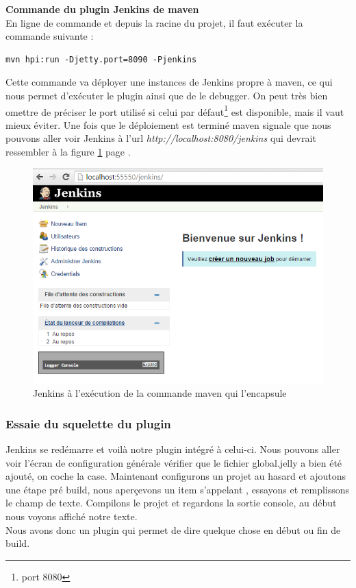\textbf{Commande du plugin Jenkins de maven}\hfill \\ \indent 
En ligne de commande et depuis la racine du projet, il faut exécuter la commande suivante :
\begin{lstlisting}
mvn hpi:run -Djetty.port=8090 -Pjenkins
\end{lstlisting}
Cette commande va déployer une instances de Jenkins propre à maven, ce qui nous permet d'exécuter le plugin ainsi que de le debugger. On peut très bien omettre de préciser le port utilisé si celui par défaut\footnote{port 8080} est disponible, mais il vaut mieux éviter. Une fois que le déploiement est terminé maven signale que  nous pouvons aller voir Jenkins à l'url \emph{http://localhost:8080/jenkins} qui devrait ressembler à la figure \ref{figure:firstJenkinsWhenGenerateTheSkeletonPlugin} page \pageref{figure:firstJenkinsWhenGenerateTheSkeletonPlugin}.
\begin{figure}[!h]
  \centering
      \includegraphics[width=\textwidth]{images/firstJenkinsWhenGenerateTheSkeletonPlugin.png}
  \caption{Jenkins à l'exécution de la commande maven qui l'encapsule}
	\label{figure:firstJenkinsWhenGenerateTheSkeletonPlugin}
\end{figure}



\subsubsection{Essaie du squelette du plugin}
Jenkins se redémarre et voilà notre plugin intégré à celui-ci. Nous pouvons aller voir l'écran de configuration générale vérifier que le fichier global.jelly a bien été ajouté, on coche la case. Maintenant configurons un projet au hasard et ajoutons une étape pré build, nous aperçevons un item s'appelant , essayons et remplissons le champ de texte. Compilons le projet et regardons la sortie console, au début nous voyons affiché notre texte.\\
Nous avons donc un plugin qui permet de dire quelque chose en début ou fin de build. 



